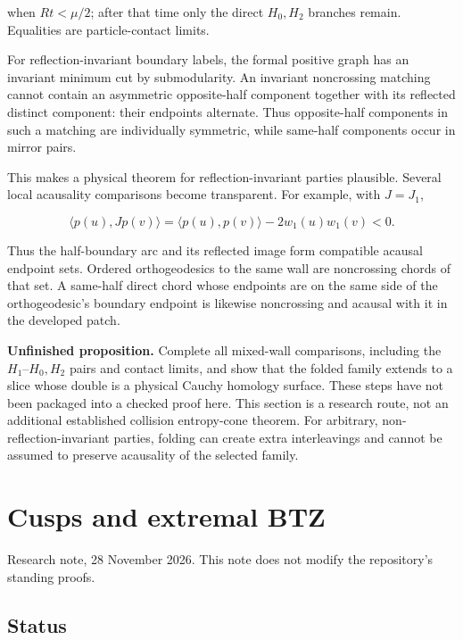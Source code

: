 \documentclass[11pt]{article}
\begin{document}
when \(Rt<\mu/2\); after that time only the direct \(H_0,H_2\) branches
remain. Equalities are particle-contact limits.

For reflection-invariant boundary labels, the formal positive graph has
an invariant minimum cut by submodularity. An invariant noncrossing
matching cannot contain an asymmetric opposite-half component together
with its reflected distinct component: their endpoints alternate. Thus
opposite-half components in such a matching are individually symmetric,
while same-half components occur in mirror pairs.

This makes a physical theorem for reflection-invariant parties
plausible. Several local acausality comparisons become transparent. For
example, with \(J=J_1\),

\[
 \langle p(u),Jp(v)\rangle
 =\langle p(u),p(v)\rangle-2w_1(u)w_1(v)<0.
\]

Thus the half-boundary arc and its reflected image form compatible
acausal endpoint sets. Ordered orthogeodesics to the same wall are
noncrossing chords of that set. A same-half direct chord whose endpoints
are on the same side of the orthogeodesic's boundary endpoint is
likewise noncrossing and acausal with it in the developed patch.

\textbf{Unfinished proposition.} Complete all mixed-wall comparisons,
including the \(H_1\)--\(H_0,H_2\) pairs and contact limits, and show
that the folded family extends to a slice whose double is a physical
Cauchy homology surface. These steps have not been packaged into a
checked proof here. This section is a research route, not an additional
established collision entropy-cone theorem. For arbitrary,
non-reflection-invariant parties, folding can create extra interleavings
and cannot be assumed to preserve acausality of the selected family.

\clearpage

\section{Cusps and extremal BTZ}\label{cusps-and-extremal-btz}

Research note, 28 November 2026. This note does not modify the
repository's standing proofs.

\subsection{Status}\label{status}
\end{document}
